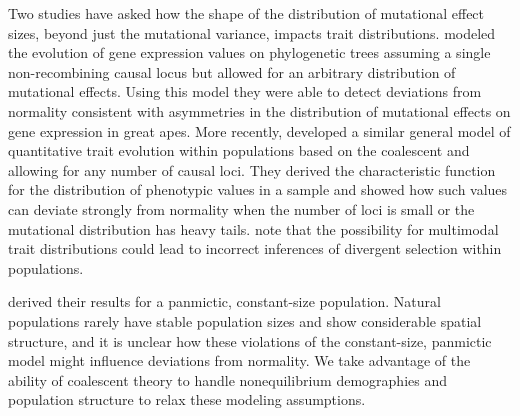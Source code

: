 Two studies have asked how the shape of the distribution of mutational effect
sizes, beyond just the mutational variance, impacts trait
distributions. \citet{Khaitovich2005} modeled the evolution of gene expression
values on phylogenetic trees assuming a single non-recombining causal locus but
allowed for an arbitrary distribution of mutational effects. Using this model
they were able to detect deviations from normality consistent with asymmetries
in the distribution of mutational effects on gene expression in great apes. More
recently, \citet{Schraiber2015} developed a similar general model of
quantitative trait evolution within populations based on the coalescent and
allowing for any number of causal loci. They derived the characteristic function
for the distribution of phenotypic values in a sample and showed how such values
can deviate strongly from normality when the number of loci is small or the
mutational distribution has heavy tails. \citet{Schraiber2015} note that the
possibility for multimodal trait distributions could lead to incorrect
inferences of divergent selection within populations.

\citet{Schraiber2015} derived their results for a panmictic, constant-size
population. Natural populations rarely have stable population sizes and show
considerable spatial structure, and it is unclear how these violations of the
constant-size, panmictic model might influence deviations from normality. We
take advantage of the ability of coalescent theory to handle nonequilibrium
demographies and population structure to relax these modeling assumptions.

